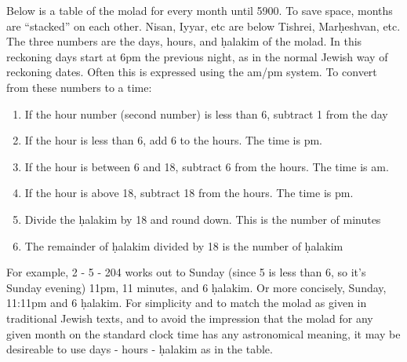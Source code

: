 Below is a table of the molad for every month until 5900.  To save space, months are ``stacked'' on each other.  Nisan, Iyyar, etc are below Tishrei, Mar\d{h}eshvan, etc.  The three numbers are the days, hours, and \d{h}alakim of the molad. In this reckoning days start at 6pm the previous night, as in the normal Jewish way of reckoning dates. Often this is expressed using the am/pm system.  To convert from these numbers to a time:
\begin{enumerate}
	\item If the hour number (second number) is less than 6, subtract 1 from the day
	\item If the hour is less than 6, add 6 to the hours.  The time is pm.
	\item If the hour is between 6 and 18, subtract 6 from the hours.  The time is am.
	\item If the hour is above 18, subtract 18 from the hours.  The time is pm.
	\item Divide the \d{h}alakim by 18 and round down. This is the number of minutes
	\item The remainder of \d{h}alakim divided by 18 is the number of \d{h}alakim
\end{enumerate}

For example, 2 - 5 - 204 works out to Sunday (since 5 is less than 6, so it's Sunday evening) 11pm, 11 minutes, and 6 \d{h}alakim.  Or more concisely, Sunday, 11:11pm and 6 \d{h}alakim. For simplicity and to match the molad as given in traditional Jewish texts, and to avoid the impression that the molad for any given month on the standard clock time has any astronomical meaning, it may be desireable to use days - hours - \d{h}alakim as in the table.

